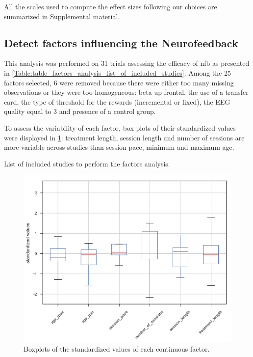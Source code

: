 All the scales used to compute the effect sizes following our choices are summarized in Supplemental material.

\subsection{Detect factors influencing the Neurofeedback}

This analysis was performed on 31 trials assessing the efficacy of \gls{nfb} as presented in \cref{Table:table_factors_analysis_list_of_included_studies}. 
Among the 25 factors selected, 6 were removed because there were either too many missing observations or they were too homogeneous: beta up frontal, 
the use of a transfer card, the type of threshold for the rewards (incremental or fixed), the EEG quality equal to 3 and presence of a control group. 

To assess the variability of each factor, box plots of their standardized values were displayed in \cref{Figure:factors_analysis_boxplots}: treatment length, 
session length and number of sessions are more variable across studies than session pace, minimum and maximum age.      

\begin{table}[h!]
  \centering
  \caption{List of included studies to perform the factors analysis.}
  
  \label{Table:table_factors_analysis_list_of_included_studies}
\end{table}

\begin{figure}[h!]
  \centering
  \includegraphics[scale=0.5]{figures/factors_analysis_boxplot_no_colors_no_two_columns}
  \caption{Boxplots of the standardized values of each continuous factor.}
  \label{Figure:factors_analysis_boxplots}
\end{figure}

